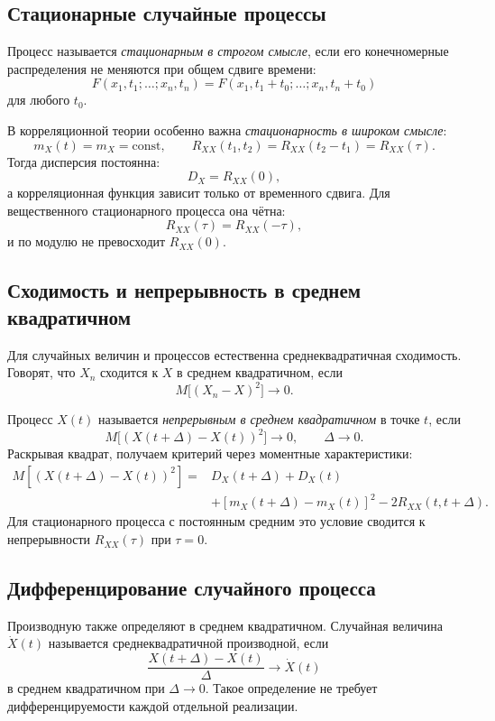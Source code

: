 \subsection{Стационарные случайные процессы}

Процесс называется \emph{стационарным в строгом смысле}, если его конечномерные
распределения не меняются при общем сдвиге времени:
\[
    F(x_1,t_1;\ldots;x_n,t_n)
    =F(x_1,t_1+t_0;\ldots;x_n,t_n+t_0)
\]
для любого $t_0$.

В корреляционной теории особенно важна \emph{стационарность в широком смысле}:
\[
    m_X(t)=m_X=\mathrm{const},
    \qquad
    R_{XX}(t_1,t_2)=R_{XX}(t_2-t_1)=R_{XX}(\tau).
\]
Тогда дисперсия постоянна:
\[
    D_X=R_{XX}(0),
\]
а корреляционная функция зависит только от временного сдвига. Для вещественного
стационарного процесса она чётна:
\[
    R_{XX}(\tau)=R_{XX}(-\tau),
\]
и по модулю не превосходит $R_{XX}(0)$.

\subsection{Сходимость и непрерывность в среднем квадратичном}

Для случайных величин и процессов естественна среднеквадратичная сходимость.
Говорят, что $X_n$ сходится к $X$ в среднем квадратичном, если
\[
    M\bigl[(X_n-X)^2\bigr]\to0.
\]

Процесс $X(t)$ называется \emph{непрерывным в среднем квадратичном} в точке
$t$, если
\[
    M\bigl[(X(t+\Delta)-X(t))^2\bigr]\to0,
    \qquad \Delta\to0.
\]
Раскрывая квадрат, получаем критерий через моментные характеристики:
\[
\begin{aligned}
M[(X(t+\Delta)-X(t))^2]
={}&D_X(t+\Delta)+D_X(t)\\
 &+[m_X(t+\Delta)-m_X(t)]^2
 -2R_{XX}(t,t+\Delta).
\end{aligned}
\]
Для стационарного процесса с постоянным средним это условие сводится к
непрерывности $R_{XX}(\tau)$ при $\tau=0$.

\subsection{Дифференцирование случайного процесса}

Производную также определяют в среднем квадратичном. Случайная величина
$\dot X(t)$ называется среднеквадратичной производной, если
\[
    \frac{X(t+\Delta)-X(t)}{\Delta}
    \longrightarrow \dot X(t)
\]
в среднем квадратичном при $\Delta\to0$. Такое определение не требует
дифференцируемости каждой отдельной реализации.

